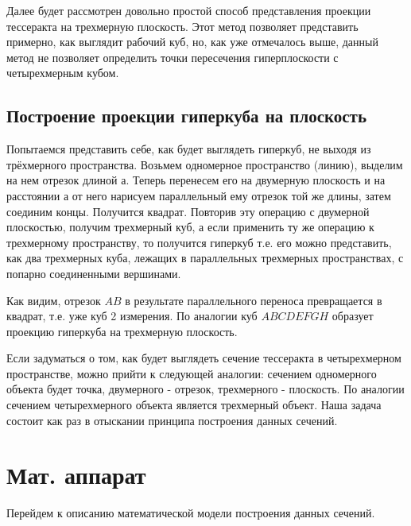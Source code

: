 \documentclass[12pt, a4paper, twoside]{report}
\begin{document}
Далее будет рассмотрен довольно простой способ представления проекции тессеракта на трехмерную плоскость. Этот метод позволяет представить примерно, как выглядит рабочий куб, но, как уже отмечалось выше, данный метод не позволяет определить точки пересечения гиперплоскости с четырехмерным кубом.
\subsection{Построение проекции гиперкуба на плоскость}
Попытаемся представить себе, как будет выглядеть гиперкуб, не выходя из трёхмерного пространства. Возьмем одномерное пространство (линию), выделим на нем отрезок длиной $а$. Теперь перенесем его на двумерную плоскость и на расстоянии $а$ от него нарисуем параллельный ему отрезок той же длины, затем соединим концы. Получится квадрат. Повторив эту операцию с двумерной плоскостью, получим трехмерный куб, а если применить ту же операцию к трехмерному пространству, то получится гиперкуб т.е. его можно представить, как два трехмерных куба, лежащих в параллельных трехмерных пространствах, с попарно соединенными вершинами.

\begin{figure}[h!]
	\clearpage
\end{figure}

Как видим, отрезок $AB$ в результате параллельного переноса превращается в квадрат, т.е. уже куб 2 измерения. По аналогии куб $ABCDEFGH$ образует проекцию гиперкуба на трехмерную плоскость.

Если задуматься о том, как будет выглядеть сечение тессеракта в четырехмерном пространстве, можно прийти к следующей аналогии: сечением одномерного объекта будет точка, двумерного -  отрезок, трехмерного - плоскость. По аналогии сечением четырехмерного объекта является трехмерный объект. Наша задача состоит как раз в отыскании принципа построения данных сечений.

\section{Мат. аппарат}
Перейдем к описанию математической модели построения данных сечений.
\end{document}
